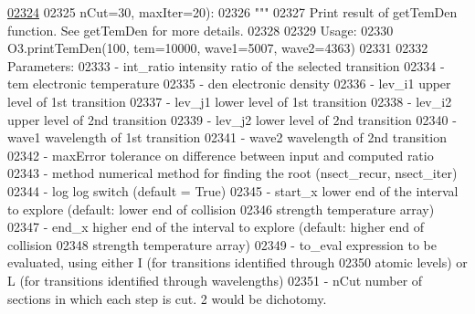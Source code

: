 \begin{DoxyCode}
\hypertarget{classpyneb_1_1core_1_1pynebcore_1_1_atom_l02324}{}\hyperlink{classpyneb_1_1core_1_1pynebcore_1_1_atom_a0b95239f3b76bbd0e42da220370ff866}{02324} 
02325                     nCut=30, maxIter=20):
02326         \textcolor{stringliteral}{""" }
02327 \textcolor{stringliteral}{        Print result of getTemDen function. See getTemDen for more details.}
02328 \textcolor{stringliteral}{        }
02329 \textcolor{stringliteral}{        Usage:}
02330 \textcolor{stringliteral}{            O3.printTemDen(100, tem=10000, wave1=5007, wave2=4363)}
02331 \textcolor{stringliteral}{        }
02332 \textcolor{stringliteral}{        Parameters:}
02333 \textcolor{stringliteral}{            - int\_ratio    intensity ratio of the selected transition}
02334 \textcolor{stringliteral}{            - tem          electronic temperature}
02335 \textcolor{stringliteral}{            - den          electronic density}
02336 \textcolor{stringliteral}{            - lev\_i1       upper level of 1st transition}
02337 \textcolor{stringliteral}{            - lev\_j1       lower level of 1st transition}
02338 \textcolor{stringliteral}{            - lev\_i2       upper level of 2nd transition}
02339 \textcolor{stringliteral}{            - lev\_j2       lower level of 2nd transition}
02340 \textcolor{stringliteral}{            - wave1        wavelength of 1st transition}
02341 \textcolor{stringliteral}{            - wave2        wavelength of 2nd transition}
02342 \textcolor{stringliteral}{            - maxError     tolerance on difference between input and computed ratio }
02343 \textcolor{stringliteral}{            - method       numerical method for finding the root (nsect\_recur, nsect\_iter)}
02344 \textcolor{stringliteral}{            - log          log switch (default = True)}
02345 \textcolor{stringliteral}{            - start\_x      lower end of the interval to explore (default: lower end of collision }
02346 \textcolor{stringliteral}{                            strength temperature array)}
02347 \textcolor{stringliteral}{            - end\_x        higher end of the interval to explore (default: higher end of collision }
02348 \textcolor{stringliteral}{                            strength temperature array)}
02349 \textcolor{stringliteral}{            - to\_eval      expression to be evaluated, using either I (for transitions identified through }
02350 \textcolor{stringliteral}{                            atomic levels) or L (for transitions identified through wavelengths)}
02351 \textcolor{stringliteral}{            - nCut        number of sections in which each step is cut. 2 would be dichotomy.}

\end{DoxyCode}
